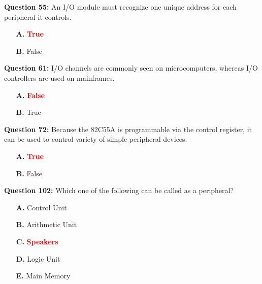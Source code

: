 \documentclass[12pt,a4paper]{article}
\begin{document}
\textbf{Question 55:} An I/O module must recognize one unique address for each peripheral it controls.

\begin{itemize}
    \item[\textbf{A.}] \textcolor{red}{\textbf{True}}
    \item[\textbf{B.}] False
\end{itemize}

\vspace{0.5cm}

\vspace{0.5cm}

\textbf{Question 61:} I/O channels are commonly seen on microcomputers, whereas I/O controllers are used on mainframes.

\begin{itemize}
    \item[\textbf{A.}] \textcolor{red}{\textbf{False}}
    \item[\textbf{B.}] True
\end{itemize}

\vspace{0.5cm}

\vspace{0.5cm}

\textbf{Question 72:} Because the 82C55A is programmable via the control register, it can be used to control variety of simple peripheral devices.

\begin{itemize}
    \item[\textbf{A.}] \textcolor{red}{\textbf{True}}
    \item[\textbf{B.}] False
\end{itemize}

\vspace{0.5cm}

\vspace{0.5cm}

\textbf{Question 102:} Which one of the following can be called as a peripheral?

\begin{itemize}
    \item[\textbf{A.}] Control Unit
    \item[\textbf{B.}] Arithmetic Unit
    \item[\textbf{C.}] \textcolor{red}{\textbf{Speakers}}
    \item[\textbf{D.}] Logic Unit
    \item[\textbf{E.}] Main Memory
\end{itemize}
\end{document}

